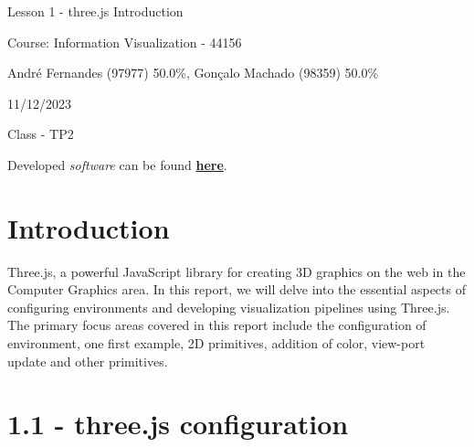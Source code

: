 \documentclass[12pt]{article}
\begin{document}
\begin{titlepage}
   \begin{center}
        \vspace*{5cm}

        \Huge{Lesson 1 - three.js Introduction}

        \vspace{0.5cm}
        \LARGE{} %
            
        \vspace{3 cm}
        \Large{Course: Information Visualization - 44156}
       
        \vspace{0.25cm}
        \large{André Fernandes (97977) 50.0\%, Gonçalo Machado (98359) 50.0\%}
       
        \vspace{3 cm}
        \Large{11/12/2023}
        
        \vspace{0.25 cm}
        \Large{Class - TP2}
        
        \vspace{5cm}
        \Large{Developed \emph{software} can be found \textbf{\href{https://github.com/goncalo-machado/VI}{here}}.}
       

       \vfill
    \end{center}
\end{titlepage}

\setcounter{page}{2}
\pagestyle{fancy}
\fancyhf{}
\rhead{\thepage}

\section*{Introduction}
\label{intro}

Three.js, a powerful JavaScript library for creating 3D graphics on the web in the Computer Graphics area. In this report, we will delve into the essential aspects of configuring environments and developing visualization pipelines using Three.js. The primary focus areas covered in this report include the configuration of environment, one first example, 2D primitives, addition of color, view-port update and other primitives.

\section*{1.1 - three.js configuration}
\label{ex_11}
\end{document}
